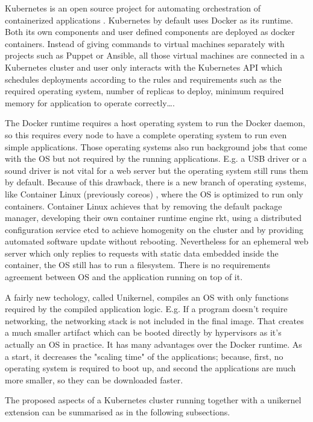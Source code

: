 Kubernetes is an open source project for automating orchestration of containerized applications \cite{Hightower:2017:KUR:3175917}. Kubernetes by default uses Docker as its runtime. Both its own components and user defined components are deployed as docker containers. Instead of giving commands to virtual machines separately with projects such as Puppet or Ansible, all those virtual machines are connected in a Kubernetes cluster and user only interacts with the Kubernetes API which schedules deployments according to the rules and requirements such as the required operating system, number of replicas to deploy, minimum required memory for application to operate correctly\ldots.

The Docker runtime requires a host operating system to run the Docker daemon, so this requires every node to have a complete operating system to run even simple applications. Those operating systems also run background jobs that come with the OS but not required by the running applications. E.g. a USB driver or a sound driver is not vital for a web server but the operating system still runs them by default. Because of this drawback, there is a new branch of operating systems, like Container Linux (previously coreos) \cite{coreos}, where the OS is optimized to run only containers. Container Linux achieves that by removing the default package manager, developing their own container runtime engine rkt, using a distributed configuration service etcd to achieve homogenity on the cluster and by providing automated software update without rebooting. Nevertheless for an ephemeral web server which only replies to requests with static data embedded inside the container, the OS still has to run a filesystem. There is no requirements agreement between OS and the application running on top of it.

A fairly new techology, called Unikernel, compiles an OS with only functions required by the compiled application logic. E.g. If a program doesn't require networking, the networking stack is not included in the final image. That creates a much smaller artifact which can be booted directly by hypervisors as it's actually an OS in practice. It has many advantages over the Docker runtime. As a start, it decreases the "scaling time" \cite{Podolskiy:2017:QCA:3069383.3069390} of the applications; because, first, no operating system is required to boot up, and second the applications are much more smaller, so they can be downloaded faster.

The proposed aspects of a Kubernetes cluster running together with a unikernel extension can be summarised as in the following subsections.

